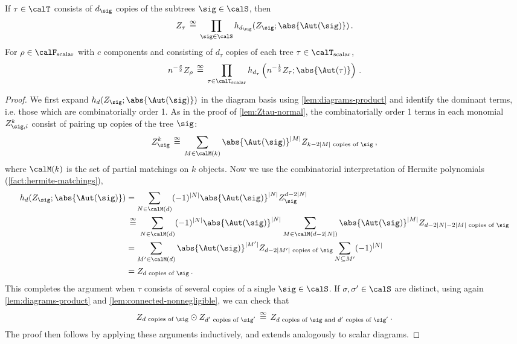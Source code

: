 \documentclass[12pt]{article}
\newcommand{\scalar}{\textnormal{scalar}}
\newcommand{\eqinf}{\,\overset{\infty}{=}\,}
\begin{document}
\begin{lemma}\label{lem:Ztau-hermite}
    If $\tau \in \calT$ consists of
    $d_\sig$ copies of the subtrees $\sig \in \calS$, then
    \[Z_{\tau} \eqinf \prod_{\sig \in \calS} h_{d_\sig}(Z_{\sig}; \abs{\Aut(\sig)})\,.\]
    For $\rho \in \calF_{\scalar}$ with $c$ components and
    consisting of $d_\tau$ copies of each tree $\tau \in \calT_{\scalar}$,
    \[n^{-\frac c 2} Z_\rho \eqinf \prod_{\tau \in \calT_{\scalar}} h_{d_\tau}\left(n^{-\frac 1 2}Z_{\tau}; \abs{\Aut(\tau)}\right)\,.\]
\end{lemma}
\begin{proof}
    We first expand $h_{d}(Z_{\sig}; \abs{\Aut(\sig)})$ in the diagram basis using \cref{lem:diagrams-product}
    and identify the dominant terms, i.e. those which are combinatorially order 1.
    As in the proof of \cref{lem:Ztau-normal}, the combinatorially order 1 terms in each monomial $Z_{\sig, i}^k$ consist of
    pairing up copies of the tree $\sig$:
    \[
        Z_{\sig}^k \eqinf \sum_{M \in \calM(k)} \abs{\Aut(\sig)}^{|M|} Z_{k - 2|M|\text{ copies of }\sig}\,,
    \]
    where $\calM(k)$ is the set of partial matchings on $k$ objects.
    Now we use the combinatorial interpretation of Hermite polynomials (\cref{fact:hermite-matchings}),
    \begin{align*}
        h_d(Z_\sig; \abs{\Aut(\sig)}) &= \sum_{N \in \calM(d)} (-1)^{|N|} \abs{\Aut(\sig)}^{|N|} Z_{\sig}^{d - 2|N|}\\
        &\eqinf \sum_{N \in \calM(d)} (-1)^{|N|} \abs{\Aut(\sig)}^{|N|} \sum_{M \in \calM(d - 2|N|)}  \abs{\Aut(\sig)}^{|M|} Z_{d - 2|N| - 2|M| \text{ copies of }\sig}\\
        &= \sum_{M' \in \calM(d)}  \abs{\Aut(\sig)}^{|M'|} Z_{d - 2|M'|\text{ copies of }\sig} \sum_{N \subseteq M'} (-1)^{|N|}\\
        &= Z_{d\text{ copies of }\sig}\,.
    \end{align*}
    This completes the argument when $\tau$ consists of several copies of a single $\sig \in \calS$.
    If $\sigma,\sigma'\in\calS$ are distinct, using again \cref{lem:diagrams-product} and \cref{lem:connected-nonnegligible}, we can check that
    \[
        Z_{\text{$d$ copies of $\sig$}}\odot Z_{\text{$d'$ copies of $\sig'$}} \eqinf Z_{\text{$d$ copies of $\sig$ and $d'$ copies of $\sig'$}}\,.
    \]
    The proof then follows by applying these arguments inductively, and 
extends analogously to scalar diagrams.
\end{proof}
\end{document}
